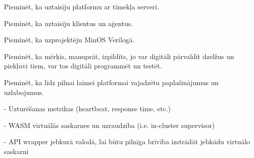 Pieminēt, ka uztaisīju platformu ar tīmekļa serveri.

Pieminēt, ka uztaisīju klientus un aģentus.

Pieminēt, ka uzprojektēju MinOS Verilogā.

Pieminēt, ka mērķis, manuprāt, izpildīts, jo var digitāli pārvaldīt dzelžus un piekļuvi tiem, var tos digitāli programmēt un testēt.   

Pieminēt, ka līdz pilnai laimei platformai vajadzētu paplašinājumus un uzlabojumus.

- Uzturēšanas metrikas (heartbeat, response time, etc.)

- WASM virtuālās saskarnes un uzraudzība (i.e. in-cluster supervisor)

- API wrapper jebkurā valodā, lai būtu pilnīga brīvība izstrādāt jebkādu virtuālo saskarni
